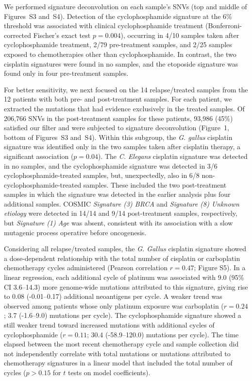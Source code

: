 \documentclass[linenumbers]{bmcart}
\begin{document}
We performed signature deconvolution on each sample's SNVs (top and middle of Figures~S3 and~S4). Detection of the cyclophosphamide signature at the 6\% threshold was associated with clinical cyclophosphamide treatment (Bonferroni-corrected Fischer's exact test $p = 0.004$), occurring in 4/10 samples taken after cyclophosphamide treatment, 2/79 pre-treatment samples, and 2/25 samples exposed to chemotherapies other than cyclophosphamide. In contrast, the two cisplatin signatures were found in no samples, and the etoposide signature was found only in four pre-treatment samples.

For better sensitivity, we next focused on the 14 relapse/treated samples from the 12 patients with both pre- and post-treatment samples. For each patient, we extracted the mutations that had evidence exclusively in the treated samples. Of 206,766 SNVs in the post-treatment samples for these patients, 93,986 (45\%) satisfied our filter and were subjected to signature deconvolution (Figure~1, bottom of Figures~S3 and~S4). Within this subgroup, the \textit{G. gallus} cisplatin signature was identified only in the two samples taken after cisplatin therapy, a significant association ($p = 0.04$). The \textit{C. Elegans} cisplatin signature was detected in no samples, and the cyclophosphamide signature was detected in 3/6 cyclophosphamide-treated samples, but, unexpectedly, also in 6/8 non-cyclophosphamide-treated samples. These included the two post-treatment samples in which the signature was detected in the earlier analysis plus four additional samples. COSMIC \textit{Signature (3) BRCA} and \textit{Signature (8) Unknown etiology} were detected in 14/14 and 9/14 post-treatment samples, respectively, but \textit{Signature (1) Age} was absent, consistent with its association with a slow mutagenic process operative before oncogenesis.

Considering all relapse/treated samples, the \textit{G. Gallus} cisplatin signature showed a dose-dependent relationship with the total number of cisplatin or carboplatin chemotherapy cycles administered (Pearson correlation $r=0.47$; Figure S5). In a linear regression, each additional cycle of platinum was associated with 9.0 (95\% CI 3.6--14.3) more genome-wide mutations attributed to this signature, giving rise to 0.08 (-0.01--0.17) additional neoantigens per cycle. A weaker trend was observed among patients whose only platinum exposure was carboplatin ($r=0.24$; 3.7 (-1.6--9.0) mutations per cycle). The cyclophosphamide signature showed a still weaker trend toward increased mutations with additional cycles of cyclophosphamide ($r=0.11$; 30.4 (-58.9--120.0) mutations per cycle). The time elapsed between the most recent chemotherapy cycle and sample collection did not independently correlate with total mutations or mutations attributed to chemotherapy signatures in a linear model that included the total number of cycles ($p > 0.15$ for $t$ tests on model coefficients).
\end{document}
